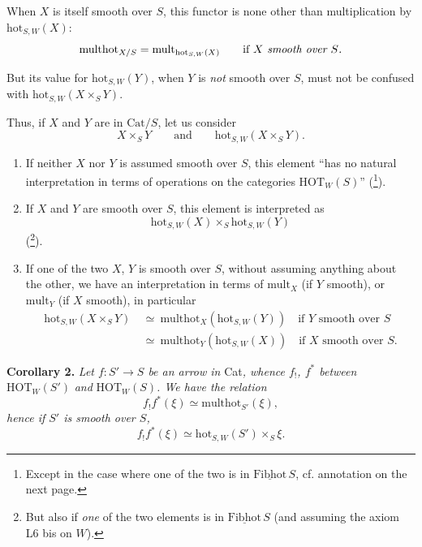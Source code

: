 \documentclass[11pt]{article}
\newcommand{\msp}[1]{\marginpar{\footnotesize [#1]}}
\newcommand{\hot}{\mathrm{hot}}
\newcommand{\HOT}{\mathrm{HOT}}
\newcommand{\Cat}{\mathrm{Cat}}
\newcommand{\multhot}{\mathrm{multhot}}
\newcommand{\mult}{\mathrm{mult}}
\begin{document}
When $X$ is itself smooth over $S$, this functor is none other than multiplication by $\hot_{S,W}(X)$:
\[\multhot_{X/S}=\mult_{\hot_{S,W}(X)}\qquad\text{if $X$ \textit{smooth over $S$.}}\]

But its value for $\hot_{S,W}(Y)$, when $Y$ is \textit{not} smooth over $S$, must not be confused with $\hot_{S,W}(X\times_S Y)$.

Thus, if $X$ and $Y$ are in $\Cat/S$, let us consider
\[X\times_S Y\qquad\text{and}\qquad\boxed{\hot_{S,W}(X\times_S Y).}\] %

\begin{enumerate}
\item[a)] If neither $X$ nor $Y$ is assumed smooth over $S$, this element ``has no natural interpretation in terms of operations on the categories $\HOT_W(S)$'' (\footnote[74]{Except in the case where one of the two is in $\underline{\mathrm{Fibhot}}\,S$, cf. annotation on the next page.}).

\msp{156}

\item[b)] If $X$ and $Y$ are smooth over $S$, this element is interpreted as
\[\hot_{S,W}(X)\times_S\hot_{S,W}(Y)\]
(\footnote[75]{But also if \textit{one} of the two elements is in $\underline{\mathrm{Fibhot}}\,S$ (and assuming the axiom L6 bis on $W$).}).

\item[c)] If one of the two $X$, $Y$ is smooth over $S$, without assuming anything about the other, we have an interpretation in terms of $\mult_X$ (if $Y$ smooth), or $\mult_Y$ (if $X$ smooth), in particular
\[\begin{aligned}
\hot_{S,W}(X\times_S Y)\ &\simeq\ \multhot_X(\hot_{S,W}(Y))\quad\text{if $Y$ smooth over $S$}\\
&\simeq\ \multhot_Y(\hot_{S,W}(X))\quad\text{if $X$ smooth over $S$.}
\end{aligned}\]
\end{enumerate}

\textbf{Corollary 2.} \textit{Let $f : S'\longrightarrow S$ be an arrow in} Cat\textit{, whence $f_!$, $f^*$ between} $\HOT_W(S')$ \textit{and} $\HOT_W(S)$\textit{. We have the relation}
\[f_!f^*(\xi)\simeq\multhot_{S'}(\xi),\]
\textit{hence if $S'$ is smooth over $S$,}
\[f_!f^*(\xi)\simeq\hot_{S,W}(S')\times_S\xi.\]
\end{document}
